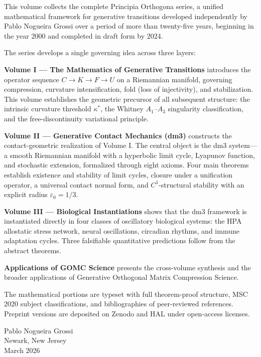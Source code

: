 \documentclass[12pt, oneside]{book}
\theoremstyle{plain}
\theoremstyle{definition}
\theoremstyle{remark}
\begin{document}
This volume collects the complete Principia Orthogona series, a unified mathematical
framework for generative transitions developed independently by Pablo Nogueira Grossi
over a period of more than twenty-five years, beginning in the year 2000 and completed
in draft form by 2024.

The series develops a single governing idea across three layers:

\textbf{Volume I --- The Mathematics of Generative Transitions} introduces the operator
sequence $C \longrightarrow K \longrightarrow F \longrightarrow U$ on a Riemannian
manifold, governing compression, curvature intensification, fold (loss of injectivity),
and stabilization. This volume establishes the geometric precursor of all subsequent
structure: the intrinsic curvature threshold $\kappa^*$, the Whitney $A_1$--$A_3$
singularity classification, and the free-discontinuity variational principle.

\textbf{Volume II --- Generative Contact Mechanics (dm3)} constructs the
contact-geometric realization of Volume I. The central object is the dm3
system---a smooth Riemannian manifold with a hyperbolic limit cycle, Lyapunov function,
and stochastic extension, formalized through eight axioms. Four main theorems establish
existence and stability of limit cycles, closure under a unification operator, a
universal contact normal form, and $C^1$-structural stability with an explicit radius
$\varepsilon_0 = 1/3$.

\textbf{Volume III --- Biological Instantiations} shows that the dm3 framework is
instantiated directly in four classes of oscillatory biological systems: the HPA
allostatic stress network, neural oscillations, circadian rhythms, and immune
adaptation cycles. Three falsifiable quantitative predictions follow from the
abstract theorems.

\textbf{Applications of GOMC Science} presents the cross-volume synthesis and
the broader applications of Generative Orthogonal Matrix Compression Science.

The mathematical portions are typeset with full theorem-proof structure, MSC 2020
subject classifications, and bibliographies of peer-reviewed references. Preprint
versions are deposited on Zenodo and HAL under open-access licenses.

\bigskip
\begin{flushright}
Pablo Nogueira Grossi\\
Newark, New Jersey\\
March 2026
\end{flushright}
\end{document}
